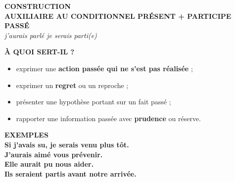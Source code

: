 \documentclass[a4paper,11pt]{article}
\begin{document}
\vspace{2.5mm}\hspace*{6mm}
\begin{minipage}{0.91\textwidth}

\begin{violetbox}
\textbf{\color{VioletDark}CONSTRUCTION}\\[1mm]
\centering
{\Large \textbf{AUXILIAIRE AU CONDITIONNEL PRÉSENT + PARTICIPE PASSÉ}}\\[1mm]
\small
\textit{j'aurais parlé \quad je serais parti(e)}
\end{violetbox}

\vspace{2.5mm}
\begin{center}
\end{center}

\vspace{1.5mm}
\begin{violetbox}
\textbf{\color{VioletDark}À QUOI SERT-IL ?}\\[1mm]
\begin{itemize}\setlength{\itemsep}{0.4mm}
\item exprimer une \textbf{action passée qui ne s'est pas réalisée} ;
\item exprimer un \textbf{regret} ou un reproche ;
\item présenter une hypothèse portant sur un fait passé ;
\item rapporter une information passée avec \textbf{prudence} ou réserve.
\end{itemize}
\end{violetbox}

\vspace{2mm}
\begin{violetbox}
\textbf{\color{VioletDark}EXEMPLES}\\[1mm]
\textbf{Si j'avais su, je serais venu plus tôt.}\\
\textbf{J'aurais aimé vous prévenir.}\\
\textbf{Elle aurait pu nous aider.}\\
\textbf{Ils seraient partis avant notre arrivée.}
\end{violetbox}


\end{minipage}
\end{document}
